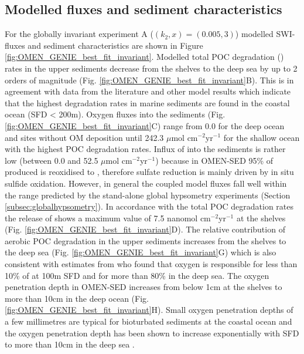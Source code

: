 \documentclass[gmd, manuscript]{copernicus}
\begin{document}
\subsection{Modelled fluxes and sediment characteristics}
For the globally invariant experiment A ($(k_2, x) = (0.005, 3)$) modelled SWI-fluxes and sediment characteristics are shown in Figure \ref{fig:OMEN_GENIE_best_fit_invariant}.
Modelled total POC degradation () rates in the upper sediments decrease from the shelves to the deep sea by up to 2 orders of magnitude (Fig. \ref{fig:OMEN_GENIE_best_fit_invariant}B). 
This is in agreement with data from the literature \citep[e.g.][]{middelburg_organic_1993, middelburg_empirical_1997} and other model results 
\citep[e.g.][]{thullner_global_scale_2009} which indicate that the highest degradation rates in marine sediments are found in the coastal ocean (SFD < 200m). 
Oxygen fluxes into the sediments (Fig. \ref{fig:OMEN_GENIE_best_fit_invariant}C) range from 0.0 for the deep ocean and sites without OM deposition until 242.3 $\mu$mol cm$^{-2}$yr$^{-1}$ for the shallow ocean with the highest POC degradation rates. 
Influx of   into the sediments is rather low (between 0.0 and 52.5 $\mu$mol cm$^{-2}$yr$^{-1}$) because in OMEN-SED 95\% of produced  is reoxidised to , therefore sulfate reduction is mainly driven by in situ sulfide oxidation. 
However, in general the coupled model fluxes fall well within the range predicted by the stand-alone global hypsometry experiments (Section \ref{subsec:globalhypsometry}). 
In accordance with the total POC degradation rates the release of  shows a maximum value of 7.5 nanomol cm$^{-2}$yr$^{-1}$ at the shelves (Fig. \ref{fig:OMEN_GENIE_best_fit_invariant}D). 
The relative contribution of aerobic POC degradation in the upper sediments increases from the shelves to the deep sea (Fig. \ref{fig:OMEN_GENIE_best_fit_invariant}G) 
which is also consistent with estimates from %
\citet{thullner_global_scale_2009} who found that oxygen is responsible for less than 10\% of  at 100m SFD and for more 
than 80\% in the deep sea. 
The oxygen penetration depth in OMEN-SED increases from below 1cm at the shelves to more than 10cm in the deep ocean (Fig. \ref{fig:OMEN_GENIE_best_fit_invariant}H).
Small oxygen penetration depths of a few millimetres are typical for bioturbated sediments at the coastal ocean \citep[e.g.][]{wenzhofer_benthic_2002} and 
the oxygen penetration depth has been shown to increase exponentially with SFD to more than 10cm in the deep sea \citep{glud_oxygen_2008}. 
\end{document}
